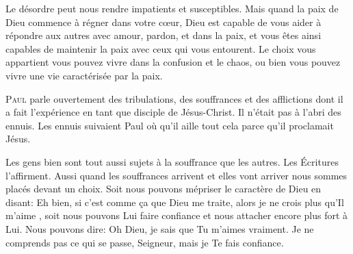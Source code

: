 Le désordre peut nous rendre impatients et susceptibles.
 Mais quand la paix de Dieu commence à régner dans votre c\oe{}ur,
 Dieu est capable de vous aider à répondre aux autres avec amour,
 pardon, et dans la paix, et vous êtes ainsi capables de maintenir
 la paix avec ceux qui vous entourent.
 Le choix vous appartient \ocadr vous pouvez vivre dans la confusion et le chaos,
 ou bien vous pouvez vivre une vie caractérisée par la paix.

\dvrule







\lettrine{P}{aul} parle ouvertement des tribulations,
 des souffrances et des afflictions dont il a fait
 l'expérience en tant que disciple de Jésus-Christ.
 Il n'était pas à l'abri des ennuis.
 Les ennuis suivaient Paul où qu'il aille
 \ocadr tout cela parce qu'il proclamait Jésus.


Les \Og gens bien \Fg{} sont tout aussi sujets
 à la souffrance que les autres.
 Les Écritures l'affirment.
 Aussi quand les souffrances arrivent
 \ocadr et elles vont arriver \fcadr{}
 nous sommes placés devant un choix.
 Soit nous pouvons mépriser le caractère de Dieu
 en disant: 
 \Og Eh bien, si c'est comme \c{c}a que Dieu me traite,
 alors je ne crois plus qu'Il m'aime \Fg{},
 soit nous pouvons Lui faire confiance et nous attacher
 encore plus fort à Lui.
 Nous pouvons dire: 
 \Og Oh Dieu, je sais que Tu m'aimes vraiment.
 Je ne comprends pas ce qui se passe, Seigneur,
 mais je Te fais confiance. \Fg{}

